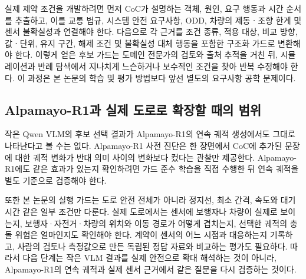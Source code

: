 실제 제약 조건을 개발하려면 먼저 CoC가 설명하는 객체, 원인, 요구 행동과 시간 순서를 추출하고, 이를 교통 법규, 시스템 안전 요구사항, ODD, 차량의 제동ㆍ조향 한계 및 센서 불확실성과 연결해야 한다. 다음으로 각 근거를 조건 종류, 적용 대상, 비교 방향, 값ㆍ단위, 유지 구간, 해제 조건 및 불확실성 대체 행동을 포함한 구조화 가드로 변환해야 한다. 이렇게 얻은 후보 가드는 도메인 전문가의 검토와 출처 추적을 거친 뒤, 시뮬레이션과 반례 탐색에서 지나치게 느슨하거나 보수적인 조건을 찾아 반복 수정해야 한다. 이 과정은 본 논문의 학습 및 평가 방법보다 앞선 별도의 요구사항 공학 문제이다.

\subsection{Alpamayo-R1과 실제 도로로 확장할 때의 범위}

작은 Qwen VLM의 후보 선택 결과가 Alpamayo-R1의 연속 궤적 생성에서도 그대로 나타난다고 볼 수는 없다. Alpamayo-R1 사전 진단은 한 장면에서 CoC에 추가된 문장에 대한 궤적 변화가 반대 의미 사이의 변화보다 컸다는 관찰만 제공한다. Alpamayo-R1에도 같은 효과가 있는지 확인하려면 가드 준수 학습을 직접 수행한 뒤 연속 궤적을 별도 기준으로 검증해야 한다.

또한 본 논문의 실행 가드는 도로 안전 전체가 아니라 정지선, 최소 간격, 속도와 대기시간 같은 일부 조건만 다룬다. 실제 도로에서는 센서에 보행자나 차량이 실제로 보이는지, 보행자·자전거·차량의 위치와 이동 경로가 어떻게 겹치는지, 선택한 궤적의 충돌 위험은 얼마인지도 확인해야 한다. 계약이 센서의 어느 시점과 대응하는지 기록하고, 사람의 검토나 측정값으로 만든 독립된 정답 자료와 비교하는 평가도 필요하다. 따라서 다음 단계는 작은 VLM 결과를 실제 안전으로 확대 해석하는 것이 아니라, Alpamayo-R1의 연속 궤적과 실제 센서 근거에서 같은 질문을 다시 검증하는 것이다.
